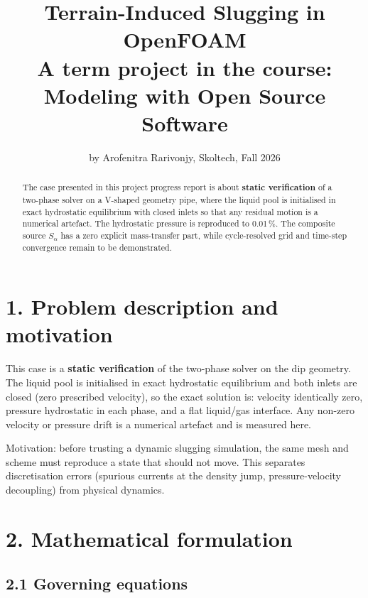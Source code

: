 \documentclass[11pt,english]{article}
\date{}
\begin{document}
\title{Terrain-Induced Slugging in OpenFOAM\\
{\large{}A term project in the course: Modeling with Open Source Software}}
\author{by Arofenitra Rarivonjy, Skoltech, Fall 2026}
\maketitle

\begin{abstract}
The case presented in this project progress report is about \textbf{static verification} of a two-phase solver on a V-shaped geometry pipe, where the liquid pool is initialised in exact hydrostatic equilibrium with closed inlets so that any residual motion is a numerical artefact. The hydrostatic pressure is reproduced to 0.01\,\%. The composite source $S_\alpha$ has a zero explicit mass-transfer part, while cycle-resolved grid and time-step convergence remain to be demonstrated.
\end{abstract}
{
\hypersetup{linkcolor=}
\setcounter{tocdepth}{2}
\tableofcontents
}

\section{1. Problem description and motivation}\label{problem-description-and-motivation}

This case is a \textbf{static verification} of the two-phase solver on
the dip geometry. The liquid pool is initialised in exact hydrostatic
equilibrium and both inlets are closed (zero prescribed velocity), so
the exact solution is: velocity identically zero, pressure hydrostatic
in each phase, and a flat liquid/gas interface. Any non-zero velocity or
pressure drift is a numerical artefact and is measured here.

Motivation: before trusting a dynamic slugging simulation, the same mesh
and scheme must reproduce a state that should not move. This separates
discretisation errors (spurious currents at the density jump,
pressure-velocity decoupling) from physical dynamics.

\section{2. Mathematical formulation}\label{mathematical-formulation}

\subsection{2.1 Governing equations}\label{governing-equations}
\end{document}
